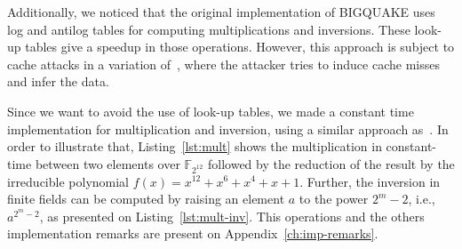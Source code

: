 Additionally, we noticed that the original implementation of BIGQUAKE uses log and antilog tables for computing multiplications and inversions. These look-up tables give a speedup in those operations. However, this approach is subject to cache attacks in a variation of~\cite{bruinderink2016flush}, where the attacker tries to induce cache misses and infer the data.

Since we want to avoid the use of look-up tables, we made a constant time implementation for multiplication and inversion, using a similar approach as~\cite{chou2017mcbits}. In order to illustrate that, Listing~\ref{lst:mult} shows the multiplication in constant-time between two elements over $\mathbb{F}_{2^{12}}$ followed by the reduction of the result by the irreducible polynomial $f(x) = x^{12} + x^6 +x^4 +x + 1$. Further, the inversion in finite fields can be computed by raising an element $a$ to the power $2^{m}-2$, i.e., $a^{2^{m}-2}$, as presented on Listing~\ref{lst:mult-inv}. This operations and the others implementation remarks are present on Appendix~\ref{ch:imp-remarks}.



